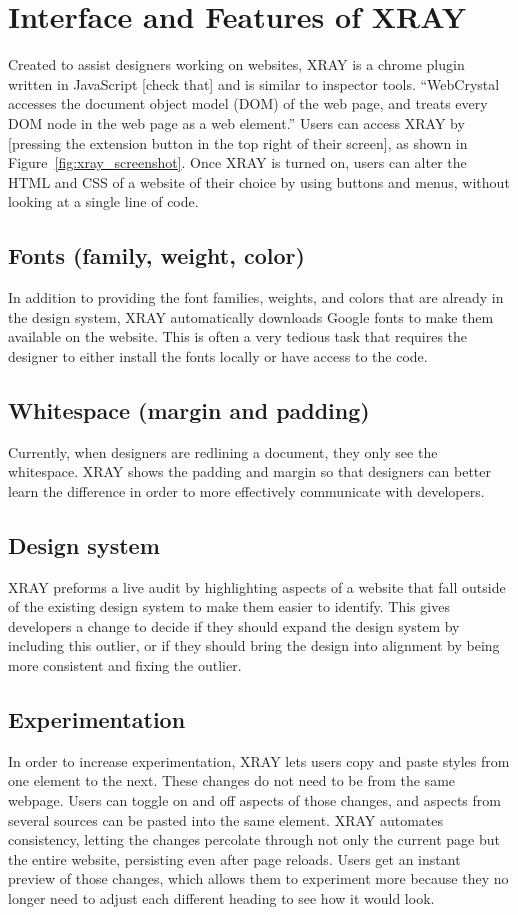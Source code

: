\documentclass{sigchi}
\newcommand{\xray}{XRAY\xspace}
\begin{document}
\section{Interface and Features of XRAY}
Created to assist designers working on websites, \xray is a chrome plugin written in JavaScript [check that] and is similar to inspector tools. ``WebCrystal accesses the document object model (DOM) of the web page, and treats every DOM node in the web page as a web element.'' Users can access \xray by [pressing the extension button in the top right of their screen], as shown in Figure~\ref{fig:xray_screenshot}. Once \xray is turned on, users can alter the HTML and CSS of a website of their choice by using buttons and menus, without looking at a single line of code. 

\subsection{Fonts (family, weight, color)}
In addition to providing the font families, weights, and colors that are already in the design system, \xray 
automatically downloads Google fonts to make them available on the website. This is often a very tedious task that requires the designer to either install the fonts locally or have access to the code.

\subsection{Whitespace (margin and padding)}
Currently, when designers are redlining a document, they only see the whitespace. \xray shows the padding and margin so that designers can better learn the difference in order to more effectively communicate with developers. 

\subsection{Design system}
\xray preforms a live audit by highlighting aspects of a website that fall outside of the existing design system to make them easier to identify. This gives developers a change to decide if they should expand the design system by including this outlier, or if they should bring the design into alignment by being more consistent and fixing the outlier. 

\subsection{Experimentation}
In order to increase experimentation, \xray lets users copy and paste styles from one element to the next. These changes do not need to be from the same webpage. Users can toggle on and off aspects of those changes, and aspects from several sources can be pasted into the same element. \xray automates consistency, letting the changes percolate through not only the current page but the entire website, persisting even after page reloads. Users get an instant preview of those changes, which allows them to experiment more because they no longer need to adjust each different heading to see how it would look. 
\end{document}
